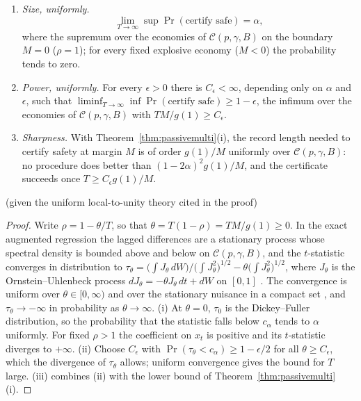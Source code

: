 \begin{theorem}\label{thm:uniformcert}
\begin{enumerate}[label=(\roman*)]
\item \emph{Size, uniformly.}
\[
\lim_{T\to\infty}\sup\Pr(\text{certify safe})=\alpha,
\]
where the supremum over the economies of $\mathcal C(p,\gamma,B)$ on the boundary $M=0$ ($\rho=1$); for every fixed explosive economy ($M<0$) the probability tends to zero.
\item \emph{Power, uniformly.} For every $\epsilon>0$ there is $C_\epsilon<\infty$, depending only on $\alpha$ and $\epsilon$, such that $\liminf_{T\to\infty}\inf\Pr(\text{certify safe})\ge1-\epsilon$, the infimum over the economies of $\mathcal C(p,\gamma,B)$ with $TM/g(1)\ge C_\epsilon$.
\item \emph{Sharpness.} With Theorem~\ref{thm:passivemulti}(i), the record length needed to certify safety at margin $M$ is of order $g(1)/M$ uniformly over $\mathcal C(p,\gamma,B)$: no procedure does better than $(1-2\alpha)^2g(1)/M$, and the certificate succeeds once $T\ge C_\epsilon g(1)/M$.
\end{enumerate}
\hfill\Proved{} (given the uniform local-to-unity theory cited in the proof)
\end{theorem}

\begin{proof}
Write $\rho=1-\theta/T$, so that $\theta=T(1-\rho)=TM/g(1)\ge0$. In the exact augmented regression the lagged differences are a stationary process whose spectral density is bounded above and below on $\mathcal C(p,\gamma,B)$, and the $t$-statistic converges in distribution to $\tau_\theta=\big(\int J_\theta\,dW\big)\big/\big(\int J_\theta^2\big)^{1/2}-\theta\big(\int J_\theta^2\big)^{1/2}$, where $J_\theta$ is the Ornstein--Uhlenbeck process $dJ_\theta=-\theta J_\theta\,dt+dW$ on $[0,1]$ \citep{t:phillips1987,t:chanwei1987}. The convergence is uniform over $\theta\in[0,\infty)$ and over the stationary nuisance in a compact set \citep{t:mikusheva2007,t:mikusheva2012}, and $\tau_\theta\to-\infty$ in probability as $\theta\to\infty$. (i) At $\theta=0$, $\tau_0$ is the Dickey--Fuller distribution, so the probability that the statistic falls below $c_\alpha$ tends to $\alpha$ uniformly. For fixed $\rho>1$ the coefficient on $x_t$ is positive and its $t$-statistic diverges to $+\infty$. (ii) Choose $C_\epsilon$ with $\Pr(\tau_\theta<c_\alpha)\ge1-\epsilon/2$ for all $\theta\ge C_\epsilon$, which the divergence of $\tau_\theta$ allows; uniform convergence gives the bound for $T$ large. (iii) combines (ii) with the lower bound of Theorem~\ref{thm:passivemulti}(i).
\end{proof}

